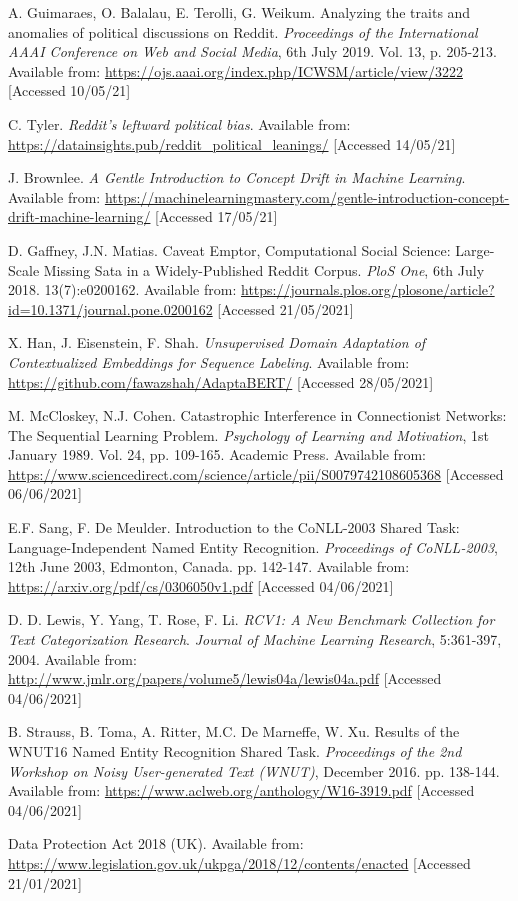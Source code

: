 \begin{thebibliography}{9}
A. Guimaraes, O. Balalau, E. Terolli, G. Weikum. Analyzing the traits and anomalies of political discussions on Reddit. \textit{Proceedings of the International AAAI Conference on Web and Social Media}, 6th July 2019. Vol. 13, p. 205-213. Available from: \url{https://ojs.aaai.org/index.php/ICWSM/article/view/3222} [Accessed 10/05/21]

C. Tyler. \textit{Reddit's leftward political bias}. Available from: \url{https://datainsights.pub/reddit_political_leanings/} [Accessed 14/05/21]

J. Brownlee. \textit{A Gentle Introduction to Concept Drift in Machine Learning}. Available from: \url{https://machinelearningmastery.com/gentle-introduction-concept-drift-machine-learning/} [Accessed 17/05/21]

D. Gaffney, J.N. Matias. Caveat Emptor, Computational Social Science: Large-Scale Missing Sata in a Widely-Published Reddit Corpus. \textit{PloS One}, 6th July 2018. 13(7):e0200162. Available from: \url{https://journals.plos.org/plosone/article?id=10.1371/journal.pone.0200162} [Accessed 21/05/2021]

X. Han, J. Eisenstein, F. Shah. \textit{Unsupervised Domain Adaptation of Contextualized Embeddings for Sequence Labeling}. Available from: \url{https://github.com/fawazshah/AdaptaBERT/} [Accessed 28/05/2021]

M. McCloskey, N.J. Cohen. Catastrophic Interference in Connectionist Networks: The Sequential Learning Problem. \textit{Psychology of Learning and Motivation}, 1st January 1989. Vol. 24, pp. 109-165. Academic Press. Available from: \url{https://www.sciencedirect.com/science/article/pii/S0079742108605368} [Accessed 06/06/2021]

E.F. Sang, F. De Meulder. Introduction to the CoNLL-2003 Shared Task: Language-Independent Named Entity Recognition. \textit{Proceedings of CoNLL-2003}, 12th June 2003, Edmonton, Canada. pp. 142-147. Available from: \url{https://arxiv.org/pdf/cs/0306050v1.pdf} [Accessed 04/06/2021]

D. D. Lewis, Y. Yang, T. Rose, F. Li. \textit{RCV1: A New Benchmark Collection for Text Categorization Research}. \textit{Journal of Machine Learning Research}, 5:361-397, 2004. Available from: \url{http://www.jmlr.org/papers/volume5/lewis04a/lewis04a.pdf} [Accessed 04/06/2021]

B. Strauss, B. Toma, A. Ritter, M.C. De Marneffe, W. Xu. Results of the WNUT16 Named Entity Recognition Shared Task. \textit{Proceedings of the 2nd Workshop on Noisy User-generated Text (WNUT)}, December 2016. pp. 138-144. Available from: \url{https://www.aclweb.org/anthology/W16-3919.pdf} [Accessed 04/06/2021]

Data Protection Act 2018 (UK). Available from: \url{https://www.legislation.gov.uk/ukpga/2018/12/contents/enacted} [Accessed 21/01/2021]

\end{thebibliography}